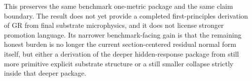 \documentclass[11pt]{article}
\begin{document}
This preserves the same benchmark one-metric package and the same claim boundary. The result does not yet provide a completed first-principles derivation of GR from final substrate microphysics, and it does not license stronger promotion language. Its narrower benchmark-facing gain is that the remaining honest burden is no longer the current section-centered residual normal form itself, but either a derivation of the deeper hidden-response package from still more primitive explicit substrate structure or a still smaller collapse strictly inside that deeper package.
\end{document}
